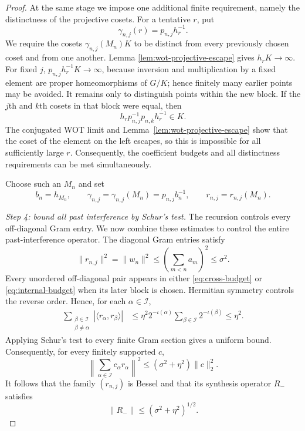 \documentclass[10pt,a4paper]{amsart}
\numberwithin{equation}{section}
\newcommand{\cI}{\mathcal I}
\newcommand{\Step}[1]{\par\medskip\noindent\textit{#1.}\quad}
\begin{document}
\begin{proof}
At the same stage we impose one additional finite requirement, namely the
distinctness of the projective cosets.  For a tentative $r$, put
\begin{equation}\label{eq:sampling-elements-tentative}
 \gamma_{n,j}(r)=p_{n,j}h_r^{-1}.
\end{equation}
We require the cosets $\gamma_{n,j}(M_n)K$ to be distinct from every
previously chosen coset and from one another.  Lemma
\ref{lem:wot-projective-escape} gives $h_rK\to\infty$.  For fixed $j$,
$p_{n,j}h_r^{-1}K\to\infty$, because inversion and multiplication by a fixed
element are proper homeomorphisms of $G/K$; hence finitely many earlier points
may be avoided.  It remains only to distinguish points within the new block.
If the $j$th and $k$th cosets in that block were equal, then
\[
 h_rp_{n,j}^{-1}p_{n,k}h_r^{-1}\in K.
\]
The conjugated WOT limit and Lemma~\ref{lem:wot-projective-escape} show that the coset
of the element on the left escapes, so this is impossible for all sufficiently
large $r$.  Consequently, the coefficient budgets and all distinctness
requirements can be met simultaneously.

Choose such an $M_n$ and set
\begin{equation}\label{eq:sampling-elements}
 b_n=h_{M_n},\qquad
 \gamma_{n,j}=\gamma_{n,j}(M_n)=p_{n,j}b_n^{-1},\qquad
 r_{n,j}=r_{n,j}(M_n).
\end{equation}

\Step{Step 4: bound all past interference by Schur's test}
The recursion controls every off-diagonal Gram entry.  We now combine these
estimates to control the entire past-interference operator.  The diagonal
Gram entries satisfy
\begin{equation}\label{eq:past-column-norm}
 \|r_{n,j}\|^2=\|w_n\|^2
 \leq\left(\sum_{m<n}a_m\right)^2
 \leq\sigma^2.
\end{equation}
Every unordered off-diagonal pair appears in either
\eqref{eq:cross-budget} or \eqref{eq:internal-budget} when its later block is
chosen.  Hermitian symmetry controls the reverse order.  Hence, for each
$\alpha\in\cI$,
\begin{align}\label{eq:past-row-sum}
 \sum_{\substack{\beta\in\cI\\\beta\neq\alpha}}
 |\langle r_\alpha,r_\beta\rangle|
 &\leq \eta^2 2^{-\iota(\alpha)}
       \sum_{\beta\in\cI}2^{-\iota(\beta)}
 \leq\eta^2.
\end{align}
Applying Schur's test to every finite Gram section gives a uniform bound.
Consequently, for every finitely supported $c$,
\[
 \left\|\sum_{\alpha\in\cI}c_\alpha r_\alpha\right\|^2
 \leq(\sigma^2+\eta^2)\|c\|_2^2.
\]
It follows that the family $(r_{n,j})$ is Bessel and that its synthesis
operator $R_-$ satisfies
\begin{equation}\label{eq:past-synthesis-bound}
 \|R_-\|\leq(\sigma^2+\eta^2)^{1/2}.
\end{equation}


\end{proof}
\end{document}

